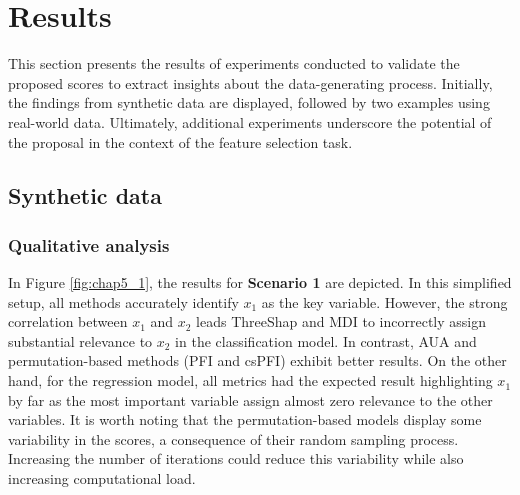 \section{Results}

This section presents the results of experiments conducted to validate the proposed scores to extract insights about the data-generating process. Initially, the findings from synthetic data are displayed, followed by two examples using real-world data. Ultimately, additional experiments underscore the potential of the proposal in the context of the feature selection task.

\subsection{Synthetic data}

\subsubsection{Qualitative analysis}

In Figure \ref{fig:chap5_1}, the results for \textbf{Scenario 1} are depicted. In this simplified setup, all methods accurately identify \(x_1\) as the key variable. However, the strong correlation between \(x_1\) and \(x_2\) leads ThreeShap and \gls{MDI} to incorrectly assign substantial relevance to \(x_2\) in the classification model. In contrast, \gls{AUA} and permutation-based methods (\gls{PFI} and \gls{csPFI}) exhibit better results. On the other hand, for the regression model, all metrics had the expected result highlighting \(x_1\) by far as the most important variable assign almost zero relevance to the other variables. It is worth noting that the permutation-based models display some variability in the scores, a consequence of their random sampling process. Increasing the number of iterations could reduce this variability while also increasing computational load. 

